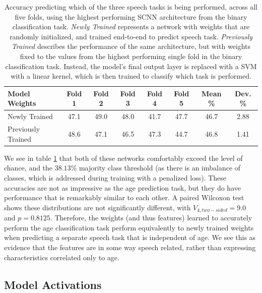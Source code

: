 \documentclass[fleqn,10pt]{wlscirep}
\begin{document}
\begin{table}[h]
 \caption{Accuracy predicting which of the three speech tasks is being performed, across all five folds, using the highest performing SCNN architecture from the binary classification task. \textit{Newly Trained} represents a network with weights that are randomly initialized, and trained end-to-end to predict speech task. \textit{Previously Trained} describes the performance of the same architecture, but with weights fixed to the values from the highest performing single fold in the binary classification task. Instead, the model's final output layer is replaced with a SVM with a linear kernel, which is then trained to classify which task is performed.}
 \centering
 \begin{tabular}{l | c | c | c | c | c | c | c}
   \toprule
   \textbf{Model Weights} & \textbf{Fold 1} & \textbf{Fold 2} & \textbf{Fold 3} & \textbf{Fold 4} & \textbf{Fold 5} & \textbf{Mean \%} & \textbf{Dev. \%}\\
   \toprule
                        Newly Trained           & 47.1 & 49.0 & 48.0 & 41.7 & 47.7 & 46.7 & 2.88 \\
   \midrule
                        Previously Trained      & 48.6 & 47.1 & 46.5 & 47.3 & 44.7 & 46.8 & 1.41 \\ 
   \bottomrule
 \end{tabular}
 \label{tab:task_results}
\end{table}

We see in table \ref{tab:task_results} that both of these networks comfortably exceed the level of chance, and the $38.13\%$ majority class threshold (as there is an imbalance of classes, which is addressed during training with a penalized loss). These accuracies are not as impressive as the age prediction task, but they do have performance that is remarkably similar to each other. A paired Wilcoxon test shows these distributions are not significantly different, with $V_{4, two-sided}=9.0$ and $p=0.8125$. Therefore, the weights (and thus features) learned to accurately perform the age classification task perform equivalently to newly trained weights when predicting a separate speech task that is independent of age. We see this as evidence that the features are in some way speech related, rather than expressing characteristics correlated only to age.

\subsection*{Model Activations}
\end{document}
